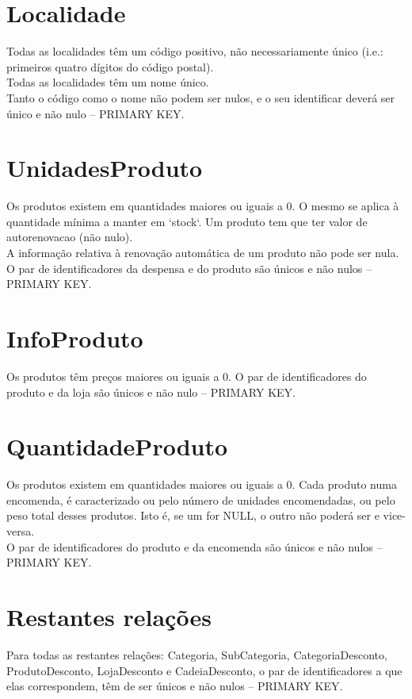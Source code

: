 \documentclass{report}
\begin{document}
\section{Localidade}
Todas as localidades têm um código positivo, não necessariamente único (i.e.:
primeiros quatro dígitos do código postal).\\
Todas as localidades têm um nome único.\\
Tanto o código como o nome não podem ser nulos, e o seu identificar deverá
ser único e não nulo -- PRIMARY KEY.
\section{UnidadesProduto}
Os produtos existem em quantidades maiores ou iguais a 0. O mesmo se aplica à
quantidade mínima a manter em `stock`. Um produto tem que ter valor de
autorenovacao (não nulo).\\
A informação relativa à renovação automática de um produto não pode ser nula.\\
O par de identificadores da despensa e do produto são únicos e não nulos -- PRIMARY KEY.
\section{InfoProduto}
Os produtos têm preços maiores ou iguais a 0.
O par de identificadores do produto e da loja são únicos e não nulo -- PRIMARY KEY.
\section{QuantidadeProduto}
Os produtos existem em quantidades maiores ou iguais a 0. Cada produto numa
encomenda, é caracterizado ou pelo número de unidades encomendadas, ou pelo
peso total desses produtos. Isto é, se um for NULL, o outro não poderá
ser e vice-versa.\\
O par de identificadores do produto e da encomenda são únicos e não nulos -- PRIMARY KEY.
\section{Restantes relações}
Para todas as restantes relações: Categoria, SubCategoria, CategoriaDesconto,
ProdutoDesconto, LojaDesconto e CadeiaDesconto, o par de identificadores a que
elas correspondem, têm de ser únicos e não nulos -- PRIMARY KEY.
\end{document}
